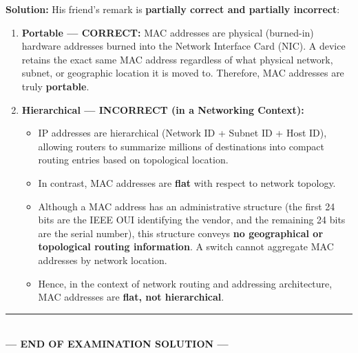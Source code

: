 \documentclass[11pt,a4paper]{article}
\begin{document}
\textbf{Solution:}
His friend's remark is \textbf{partially correct and partially incorrect}:
\begin{enumerate}
    \item \textbf{Portable --- CORRECT:}
    MAC addresses are physical (burned-in) hardware addresses burned into the Network Interface Card (NIC). A device retains the exact same MAC address regardless of what physical network, subnet, or geographic location it is moved to. Therefore, MAC addresses are truly \textbf{portable}.
    \item \textbf{Hierarchical --- INCORRECT (in a Networking Context):}
    \begin{itemize}
        \item IP addresses are hierarchical (Network ID + Subnet ID + Host ID), allowing routers to summarize millions of destinations into compact routing entries based on topological location.
        \item In contrast, MAC addresses are \textbf{flat} with respect to network topology.
        \item Although a MAC address has an administrative structure (the first 24 bits are the IEEE OUI identifying the vendor, and the remaining 24 bits are the serial number), this structure conveys \textbf{no geographical or topological routing information}. A switch cannot aggregate MAC addresses by network location.
        \item Hence, in the context of network routing and addressing architecture, MAC addresses are \textbf{flat, not hierarchical}.
    \end{itemize}
\end{enumerate}

\begin{center}
    \rule{\textwidth}{0.8pt}\\[3pt]
    \textbf{\textcolor{primary}{--- END OF EXAMINATION SOLUTION ---}}
\end{center}
\end{document}
